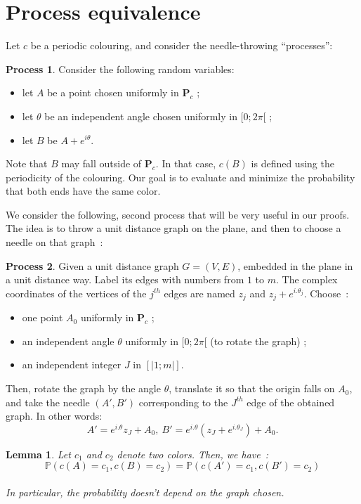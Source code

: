 \documentclass[a4paper,11pt]{article}
\newtheorem{lemma}{Lemma}
\theoremstyle{definition}
\newtheorem{process}{Process}
\theoremstyle{remark}
\renewcommand{\P}{\mathbf{P}}
\begin{document}
\section{Process equivalence}
\label{equiv}

Let $c$ be a periodic colouring, and consider the needle-throwing ``processes'':
\begin{process} \label{premier}
Consider the following random variables:
\begin{itemize}
  \item let $A$ be a point chosen uniformly 
  in $\P_c$ ;
  \item let $\theta$ be an independent angle chosen uniformly in $[0;2 \pi[$ ;
  \item let $B$ be $A + e^{i \theta}$.
\end{itemize}
\end{process}

Note that $B$ may fall outside of $\P_c$. In that case, $c(B)$ is 
defined using the periodicity of the colouring.
Our goal is to evaluate and minimize the probability that both ends have the 
same color.

We consider the following, second process that will be very useful in our 
proofs. The idea is to throw a unit distance graph on the 
plane, and then to choose a needle on that graph~:
\begin{process}
Given a unit distance graph $G = (V,E)$, embedded in the plane in 
a unit distance way. Label its edges with numbers from 
$1$ to $m$. The complex coordinates of the vertices of the $j^{th}$ edges are 
named $z_j $ and $z_j + e^{i.\theta_j}$. Choose~: 
\begin{itemize}
\item one point $A_0$ uniformly in $\P_c$ ;
\item an independent angle $\theta$ uniformly in $[0;2\pi[$ (to rotate the graph) ;
\item an independent integer $J$ in $[| 1;m|]$.
\end{itemize}
Then, rotate the graph by the angle $\theta$, translate it so that the origin 
falls on $A_0$, and take the needle $(A',B')$ corresponding to the $J^{th}$ 
edge of the obtained graph. In other words:
$$A' = e^{i.\theta} z_J + A_0, \ B' = e^{i.\theta} (z_J + e^{i.\theta_J}) + A_0.$$
\end{process}

\begin{lemma}\label{huitre}
Let $c_1$ and $c_2$ denote 
two colors. Then, we 
have~:\\
 $$\mathbb{P}(c(A) = c_1, c(B) = c_2) = \mathbb{P}(c(A') = c_1, c(B') = c_2) $$ \\
 In particular, the probability doesn't depend on the graph 
 chosen.
\end{lemma}
\end{document}
